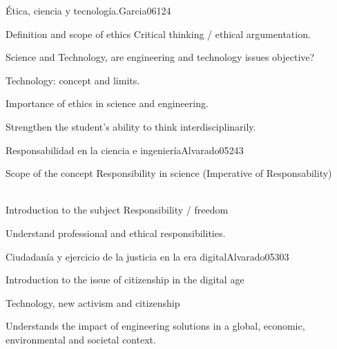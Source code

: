 \begin{syllabus}
\begin{unit}{Ética, ciencia y tecnología.}{}{Garcia06}{12}{4}
   \begin{topics}
      \item Definition and scope of ethics Critical thinking / ethical argumentation.
      \item Science and Technology, are engineering and technology issues objective?
      \item Technology: concept and limits.
      \item Importance of ethics in science and engineering.
   \end{topics}
   \begin{learningoutcomes}
      \item Strengthen the student's ability to think interdisciplinarily.
   \end{learningoutcomes}
\end{unit}

\begin{unit}{Responsabilidad en la ciencia e ingeniería}{}{Alvarado05}{24}{3}
   \begin{topics}
      \item Scope of the concept Responsibility in science (Imperative of Responsability)
      \item Introduction to the subject Responsibility / freedom
   \end{topics}

   \begin{learningoutcomes}
      \item Understand professional and ethical responsibilities.
   \end{learningoutcomes}
\end{unit}

\begin{unit}{ Ciudadanía y ejercicio de la justicia en la era digital}{}{Alvarado05}{30}{3}
   \begin{topics}
      \item Introduction to the issue of citizenship in the digital age
      \item Technology, new activism and citizenship
   \end{topics}

   \begin{learningoutcomes}
      \item  Understands the impact of engineering solutions in a global, economic, environmental and societal context.
   \end{learningoutcomes}
\end{unit}

\begin{coursebibliography}
\end{coursebibliography}

\end{syllabus}
